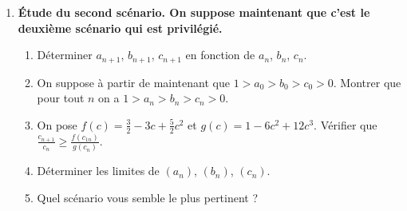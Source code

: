 \documentclass[landscape,twocolumn,leqno,a4paper,10pt]{report} %
\renewcommand{\geq}{\geqslant}
\renewcommand{\textbf}[1]{\begingroup\bfseries\mathversion{bold}#1\endgroup}		%
\begin{document}
\begin{enumerate}
\begin{enumerate}
		\item Vérifier que :
		$$a_{n+1}=\frac{a_{n}^{2}\left(3-2 a_{n}\right)}{1-6 a_{n} b_{n} c_{n}}, \quad b_{n+1}=\frac{b_{n}^{2}\left(3-2 b_{n}\right)}{1-6 a_{n} b_{n} c_{n}}, \quad c_{n+1}=\frac{c_{n}^{2}\left(3-2 c_{n}\right)}{1-6 a_{n} b_{n} c_{n}}$$
		\item On rappelle dans cette question et les suivantes que $a_{0}>b_{0}>c_{0}$. Montrer que pour tout $n \in \mathrm{N}$ on a $a_{n}>b_{n}>c_{n}$. En déduire que $a_{n}>\frac{1}{3}$, $b_{n}<\frac{1}{2}$ et $c_{n}<\frac{1}{3}$.
		\item Vérifier que les suites $\left(a_{n}-b_{n}\right)_{n \geq 0}$ et $\left(a_{n}-c_{n}\right)_{n \geq 0}$ sont croissantes.
		\item Prouver que $\left(a_{n}\right)_{n \geq 0}$, $\left(b_{n}\right)_{n \geq 0}$ et $\left(c_{n}\right)_{n \geq 0}$ convergent et déterminer leurs limites.
	\end{enumerate}
	\item \textbf{Étude du second scénario.} On suppose maintenant que c'est le deuxième scénario qui est privilégié.
	\begin{enumerate}
		\item Déterminer $a_{n+1}$, $b_{n+1}$, $c_{n+1}$ en fonction de $a_{n}$, $b_{n}$, $c_{n}$.
		\item On suppose à partir de maintenant que $1>a_{0}>b_{0}>c_{0}>0$. Montrer que pour tout $n$ on a $1>a_{n}>b_{n}>c_{n}>0$.
		\item On pose $f(c)=\frac{3}{2}-3 c+\frac{5}{2} c^{2}$ et $g(c)=1-6 c^{2}+12 c^{3}$. Vérifier que $\frac{c_{n+1}}{c_{n}} \geq \frac{f\left(c_{1 n}\right)}{g\left(c_{n}\right)}$.
		\item Déterminer les limites de $\left(a_{n}\right)$, $\left(b_{n}\right)$, $\left(c_{n}\right)$.
		\item Quel scénario vous semble le plus pertinent ?
	\end{enumerate}
\end{enumerate}
\end{document}

